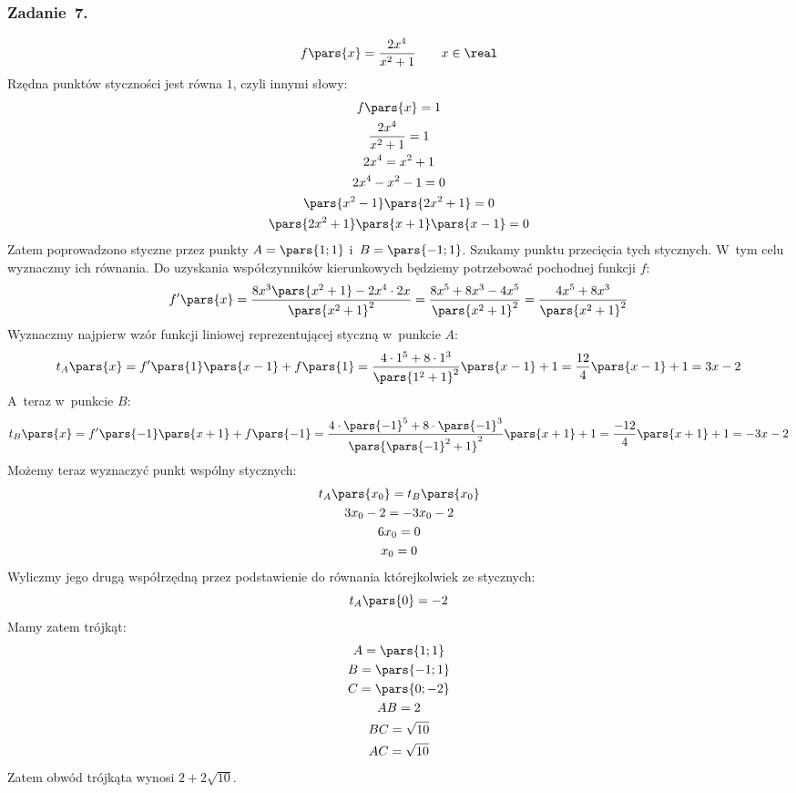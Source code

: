 \subsubsection*{Zadanie~7.}
\begin{equation*}
    f\pars{x} = \frac{2x^4}{x^2 + 1} \qquad x \in \real
\end{equation*}
Rzędna punktów styczności jest równa \(1\), czyli innymi słowy:
\begin{gather*}
    f\pars{x} = 1\\
    \frac{2x^4}{x^2 + 1} = 1\\
    2x^4 = x^2 + 1\\
    2x^4 - x^2 - 1 = 0\\
    \pars{x^2 - 1}\pars{2x^2 + 1} = 0\\
    \pars{2x^2 + 1}\pars{x + 1}\pars{x - 1} = 0
\end{gather*}
Zatem poprowadzono styczne przez punkty \(A = \pars{1; 1}\) i~\(B = \pars{-1; 1}\). Szukamy punktu przecięcia tych stycznych. W~tym celu wyznaczmy ich równania. Do uzyskania współczynników kierunkowych będziemy potrzebować pochodnej funkcji \(f\):
\begin{equation*}
    f'\pars{x}
        = \frac{8x^3\pars{x^2 + 1} - 2x^4 \cdot 2x}{\pars{x^2 + 1}^2}
        = \frac{8x^5 + 8x^3 - 4x^5}{\pars{x^2 + 1}^2}
        = \frac{4x^5 + 8x^3}{\pars{x^2 + 1}^2}
\end{equation*}
Wyznaczmy najpierw wzór funkcji liniowej reprezentującej styczną w~punkcie \(A\):
\begin{equation*}
    t_A\pars{x}
        = f'\pars{1}\pars{x - 1} + f\pars{1}
        = \frac{4 \cdot 1^5 + 8 \cdot 1^3}{\pars{1^2 + 1}^2}\pars{x - 1} + 1
        = \frac{12}{4}\pars{x - 1} + 1
        = 3x - 2
\end{equation*}
A~teraz w~punkcie \(B\):
\begin{equation*}
    t_B\pars{x}
        = f'\pars{-1}\pars{x + 1} + f\pars{-1}
        = \frac{4 \cdot \pars{-1}^5 + 8 \cdot \pars{-1}^3}{\pars{\pars{-1}^2 + 1}^2}\pars{x + 1} + 1
        = \frac{-12}{4}\pars{x + 1} + 1
        = -3x - 2
\end{equation*}
Możemy teraz wyznaczyć punkt wspólny stycznych:
\begin{gather*}
    t_A\pars{x_0} = t_B\pars{x_0}\\
    3x_0 - 2 = -3x_0 - 2\\
    6x_0 = 0\\
    x_0 = 0
\end{gather*}
Wyliczmy jego drugą współrzędną przez podstawienie do równania którejkolwiek ze stycznych:
\begin{equation*}
    t_A\pars{0} = -2
\end{equation*}
Mamy zatem trójkąt:
\begin{gather*}
    A = \pars{1; 1}\\
    B = \pars{-1; 1}\\
    C = \pars{0; -2}\\
    AB = 2\\
    BC = \sqrt{10}\\
    AC = \sqrt{10}
\end{gather*}
Zatem obwód trójkąta wynosi \(2 + 2\sqrt{10}\).
